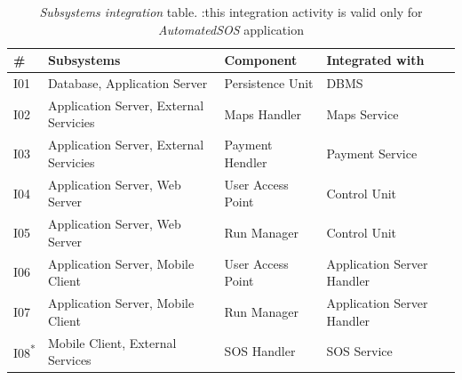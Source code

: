 \begin{center}
\begin{table}[H]
\begin{tabular}{ | l | p{} | p{} | p{} |}
  \hline
    \textbf{\#} & \textbf{Subsystems} & \textbf{Component} & \textbf{Integrated with} \\ \hline
    I01 & Database, Application Server & Persistence Unit & DBMS \\ \hline
    I02 & Application Server, External Servicies & Maps Handler & Maps Service \\ \hline
    I03 & Application Server, External Servicies & Payment Hendler & Payment Service \\ \hline
    I04 & Application Server, Web Server & User Access Point & Control Unit \\ \hline
    I05 & Application Server, Web Server & Run Manager & Control Unit \\ \hline
    I06 & Application Server, Mobile Client & User Access Point & Application Server Handler \\ \hline
    I07 & Application Server, Mobile Client & Run Manager & Application Server Handler \\ \hline
    I08\textsuperscript{*} & Mobile Client, External Services & SOS Handler & SOS Service \\ \hline
\end{tabular}
\caption{\textit{Subsystems integration} table.
\text{*}:this integration activity is valid only for \textit{AutomatedSOS} application}
\label{table:subsystemsIntegrationTable}
\end{table}
\end{center}
